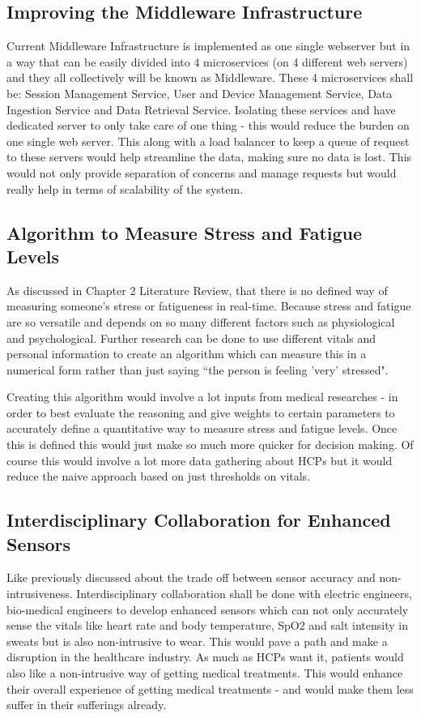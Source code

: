 \subsection{Improving the Middleware Infrastructure}
Current Middleware Infrastructure is implemented as one single webserver but in a way that can be easily divided into 4 microservices (on 4 different web servers) and they all collectively will be known as Middleware. These 4 microservices shall be: Session Management Service, User and Device Management Service, Data Ingestion Service and Data Retrieval Service. Isolating these services and have dedicated server to only take care of one thing - this would reduce the burden on one single web server. This along with a load balancer to keep a queue of request to these servers would help streamline the data, making sure no data is lost. This would not only provide separation of concerns and manage requests but would really help in terms of scalability of the system. 

\subsection{Algorithm to Measure Stress and Fatigue Levels}
As discussed in Chapter 2 Literature Review, that there is no defined way of measuring someone's stress or fatigueness in real-time. Because stress and fatigue are so versatile and depends on so many different factors such as physiological and psychological. Further research can be done to use different vitals and personal information to create an algorithm which can measure this in a numerical form rather than just saying ``the person is feeling 'very' stressed". 

Creating this algorithm would involve a lot inputs from medical researches - in order to best evaluate the reasoning and give weights to certain parameters to accurately define a quantitative way to measure stress and fatigue levels. Once this is defined this would just make so much more quicker for decision making. Of course this would involve a lot more data gathering about HCPs but it would reduce the naive approach based on just thresholds on vitals. 

\subsection{Interdisciplinary Collaboration for Enhanced Sensors}
Like previously discussed about the trade off between sensor accuracy and non-intrusiveness. Interdisciplinary collaboration shall be done with electric engineers, bio-medical engineers to develop enhanced sensors which can not only accurately sense the vitals like heart rate and body temperature, SpO2 and salt intensity in sweats but is also non-intrusive to wear. This would pave a path and make a disruption in the healthcare industry. As much as HCPs want it, patients would also like a non-intrusive way of getting medical treatments. This would enhance their overall experience of getting medical treatments - and would make them less suffer in their sufferings already. 


